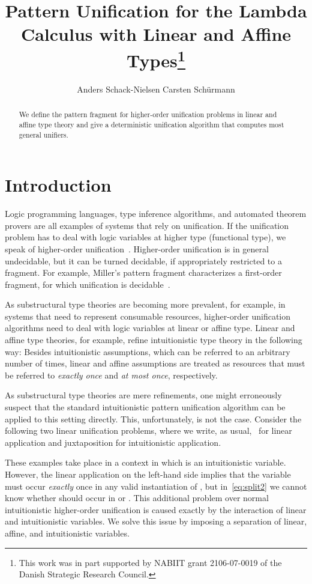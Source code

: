 \documentclass{eptcs}
\title{Pattern Unification for the Lambda Calculus with Linear and
Affine Types\thanks {\footnotesize This work was
   in part supported by NABIIT grant 2106-07-0019 of the Danish Strategic Research
   Council.}}
\author{Anders Schack-Nielsen
   \qquad\qquad
   Carsten Sch\"urmann
\institute{ 
  IT University of Copenhagen\\
  Copenhagen, Denmark \\
  \texttt{anderssn|carsten@itu.dk}}
  }
\theoremstyle{definition}
\begin{document}
\maketitle
\begin{abstract}
  We define the pattern fragment for higher-order unification problems
  in linear and affine type theory and give a deterministic
  unification algorithm  that computes most general
  unifiers.
\end{abstract}


\section{Introduction}
Logic programming languages, type inference algorithms, and automated
theorem provers are all examples of systems that rely on unification.
If the unification problem has to deal with logic variables at higher
type (functional type), we speak of higher-order
unification~\cite{Huet75}.  Higher-order unification is in general
undecidable, but it can be turned decidable, if appropriately
restricted to a fragment.  For example, Miller's pattern fragment
characterizes a first-order fragment, for which unification is
decidable~\cite{Miller91jlc}. 

As substructural type theories are becoming more prevalent, for
example, in systems that need to represent consumable resources,
higher-order unification algorithms need to deal with logic variables
at linear or affine type.  Linear and affine type theories, for
example, refine intuitionistic type theory in the following way:
Besides intuitionistic assumptions, which can be referred to an
arbitrary number of times, linear and affine assumptions are treated
as resources that must be referred to \emph{exactly once} and \emph{at
  most once}, respectively.

As substructural type theories are mere refinements, one might erroneously suspect that the standard
intuitionistic pattern unification algorithm can be applied to this setting directly.
This, unfortunately, is not the case.  Consider the following two linear unification problems, where we write, as usual,~ for linear application and
juxtaposition for intuitionistic application.

These examples take place in a context in which  is an intuitionistic
variable.  However, the linear application on the left-hand side implies
that the variable must occur \emph{exactly} once in any valid
instantiation of , but in~\eqref{eq:split2} we cannot know whether
 should occur in  or .  This additional problem over normal
intuitionistic higher-order unification is caused exactly by the
interaction of linear and intuitionistic variables.
We solve this issue by imposing a separation of linear, affine, and
intuitionistic variables.
\end{document}
